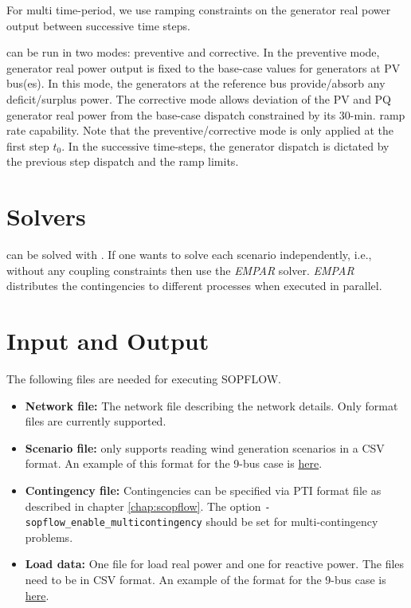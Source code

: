 For multi time-period, we use ramping constraints on the generator real power output between successive time steps.

\sopflow can be run in two modes: preventive and corrective. In the preventive mode, generator real power output is fixed to the base-case values for generators at PV bus(es). In this mode, the generators at the reference bus provide/absorb any deficit/surplus power. The corrective mode allows deviation of the PV and PQ generator real power from the base-case dispatch constrained by its 30-min. ramp rate capability. Note that the preventive/corrective mode is only applied at the first step $t_0$. In the successive time-steps, the generator dispatch is dictated by the previous step dispatch and the ramp limits.

\section{Solvers}
\sopflow can be solved with \ipopt. If one wants to solve each scenario independently, i.e., without any coupling constraints then use the \emph{EMPAR} solver. \emph{EMPAR} distributes the contingencies to different processes when executed in parallel.

\section{Input and Output}
The following files are needed for executing SOPFLOW.
\begin{itemize}
    \item \textbf{Network file:} The network file describing the network details. Only \matpower format files are currently supported.
    \item \textbf{Scenario file:} \sopflow only supports reading wind generation scenarios in a CSV format. An example of this format for the 9-bus case is \href{https://gitlab.pnnl.gov/exasgd/frameworks/exago/-/tree/master/datafiles/case9/scenarios_9bus.csv}{here}.
    \item \textbf{Contingency file:} Contingencies can be specified via PTI format file as described in chapter \ref{chap:scopflow}. The option \lstinline{-sopflow_enable_multicontingency} should be set for multi-contingency problems.
    \item \textbf{Load data:} One file for load real power and one for reactive power. The files need to be in CSV format. An example of the format for the 9-bus case is \href{https://gitlab.pnnl.gov/exasgd/frameworks/exago/-/tree/master/datafiles/case9}{here}.
\end{itemize}

